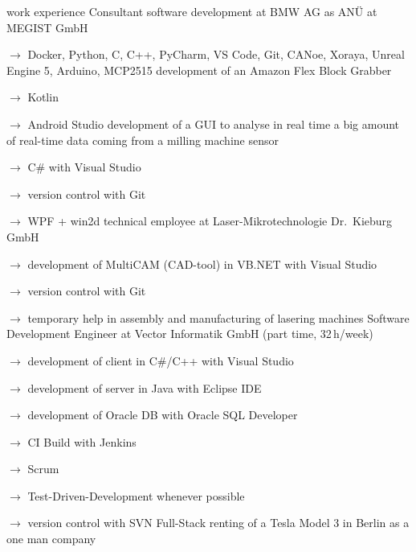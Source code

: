 \versionLanguageStart%
\begin{rubric}{\textcolor{black!20!blue!100}{work experience}}%
		\entry*[05/2023 --- 02/2024]
			Consultant software development at BMW AG as ANÜ at \glqq MEGIST GmbH\grqq
			
			\setlength{\hangindent}{\widthof{$\rightarrow$ }}
			$\rightarrow$ Docker, Python, C, C++, PyCharm, VS Code, Git, CANoe, Xoraya, Unreal Engine 5, Arduino, MCP2515
		\entry*[2021 --- 2022]
			development of an Amazon Flex Block Grabber
			
			\setlength{\hangindent}{\widthof{$\rightarrow$ }}
			$\rightarrow$ Kotlin
			
			$\rightarrow$ Android Studio
		\entry*[03/2020 --- 05/2020]
			development of a GUI to analyse in real time a big amount of real-time data coming from a milling machine sensor
			
			\setlength{\hangindent}{\widthof{$\rightarrow$ }}
			$\rightarrow$ C\# with Visual Studio
			
			$\rightarrow$ version control with Git
			
			$\rightarrow$ WPF + win2d
		\entry*[04/07/2019 --- 30/09/2020]
			technical employee at \glqq Laser-Mikrotechnologie Dr.\ Kieburg GmbH\grqq
			
			\setlength{\hangindent}{\widthof{$\rightarrow$ }}
			$\rightarrow$ development of MultiCAM (CAD-tool) in VB.NET with Visual Studio
			
			$\rightarrow$ version control with Git
			
			$\rightarrow$ temporary help in assembly and manufacturing of lasering machines
		\entry*[11/2017 --- 03/2019]
			Software Development Engineer at Vector Informatik GmbH (part time, 32\,h/week)
			
			\setlength{\hangindent}{\widthof{$\rightarrow$ }}
			$\rightarrow$ development of client in C\#/C++ with Visual Studio
			
			$\rightarrow$ development of server in Java with Eclipse IDE
			
			$\rightarrow$ development of Oracle DB with Oracle SQL Developer
			
			$\rightarrow$ CI Build with Jenkins
			
			$\rightarrow$ Scrum
			
			$\rightarrow$ Test-Driven-Development whenever possible
			
			$\rightarrow$ version control with SVN
		\entry*[10/2019 --- 03/2023]
			Full-Stack renting of a Tesla Model 3 in Berlin as a one man company
			

\end{rubric}
